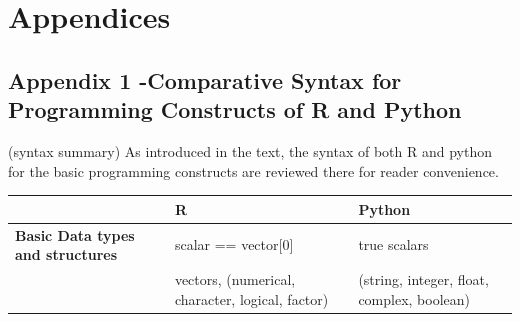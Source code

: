 \documentclass[]{book}
\theoremstyle{definition}
\theoremstyle{definition}
\theoremstyle{definition}
\theoremstyle{remark}
\begin{document}
\part{Appendices}\label{part-appendices}

\chapter{Appendix 1 -Comparative Syntax for Programming Constructs of R
and
Python}\label{appendix-1--comparative-syntax-for-programming-constructs-of-r-and-python}

 \index(syntax summary)  As
introduced in the text, the syntax of both R and python for the basic
programming constructs are reviewed there for reader convenience.

\begin{longtable}[]{@{}lll@{}}
\toprule
\begin{minipage}[b]{0.19\columnwidth}\raggedright\strut
\strut
\end{minipage} & \begin{minipage}[b]{0.33\columnwidth}\raggedright\strut
R\strut
\end{minipage} & \begin{minipage}[b]{0.39\columnwidth}\raggedright\strut
Python\strut
\end{minipage}\tabularnewline
\midrule
\endhead
\begin{minipage}[t]{0.19\columnwidth}\raggedright\strut
\textbf{Basic Data types and structures }\strut
\end{minipage} & \begin{minipage}[t]{0.33\columnwidth}\raggedright\strut
scalar == vector{[}0{]}\strut
\end{minipage} & \begin{minipage}[t]{0.39\columnwidth}\raggedright\strut
true scalars\strut
\end{minipage}\tabularnewline
\begin{minipage}[t]{0.19\columnwidth}\raggedright\strut
\strut
\end{minipage} & \begin{minipage}[t]{0.33\columnwidth}\raggedright\strut
vectors, (numerical, character, logical, factor)\strut
\end{minipage} & \begin{minipage}[t]{0.39\columnwidth}\raggedright\strut
(string, integer, float, complex, boolean)\strut
\end{minipage}\tabularnewline

\end{longtable}
\end{document}
